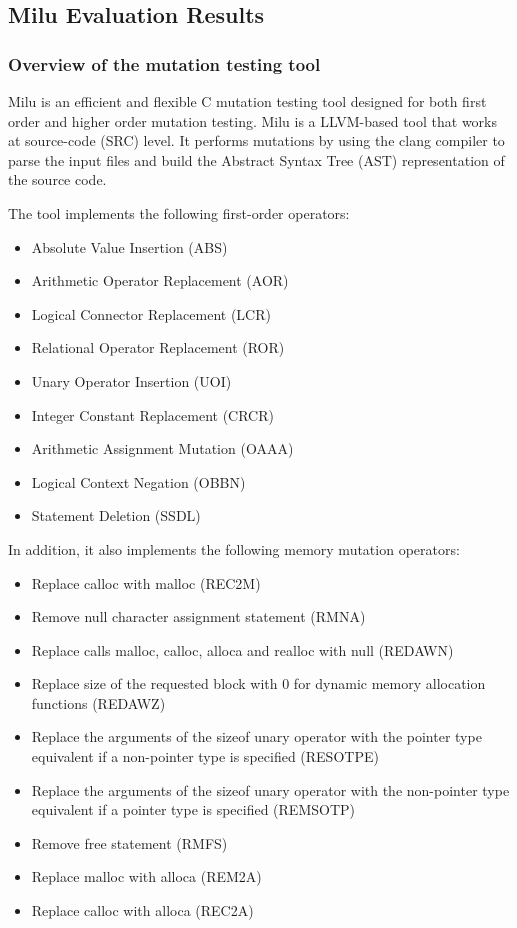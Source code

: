 \subsection{Milu Evaluation Results}
\label{subsec:milu}

\subsubsection{Overview of the mutation testing tool}

Milu is an efficient and flexible C mutation testing tool designed for both first order and higher order mutation testing. Milu is a LLVM-based tool that works at source-code (SRC) level. It performs mutations by using the clang compiler to parse the input files and build the Abstract Syntax Tree (AST) representation of the source code.

The tool implements the following first-order operators:
\begin{itemize}
	\item Absolute Value Insertion (ABS)
	\item Arithmetic Operator Replacement (AOR)
	\item Logical Connector Replacement (LCR)
	\item Relational Operator Replacement (ROR)
	\item Unary Operator Insertion (UOI)
	\item Integer Constant Replacement (CRCR)
	\item Arithmetic Assignment Mutation (OAAA)
	\item Logical Context Negation (OBBN)
	\item Statement Deletion (SSDL)
\end{itemize}

In addition, it also implements the following memory mutation operators:
\begin{itemize}
	\item Replace calloc with malloc (REC2M)
	\item Remove null character assignment statement (RMNA)
	\item Replace calls malloc, calloc, alloca and realloc with null (REDAWN)
	\item Replace size of the requested block with 0 for dynamic memory allocation functions
	(REDAWZ)
	\item Replace the arguments of the sizeof unary operator with the pointer type equivalent if a
	non-pointer type is specified (RESOTPE)
	\item Replace the arguments of the sizeof unary operator with the non-pointer type equivalent
	if a pointer type is specified (REMSOTP)
	\item Remove free statement (RMFS)
	\item Replace malloc with alloca (REM2A)
	\item Replace calloc with alloca (REC2A) 
\end{itemize}


